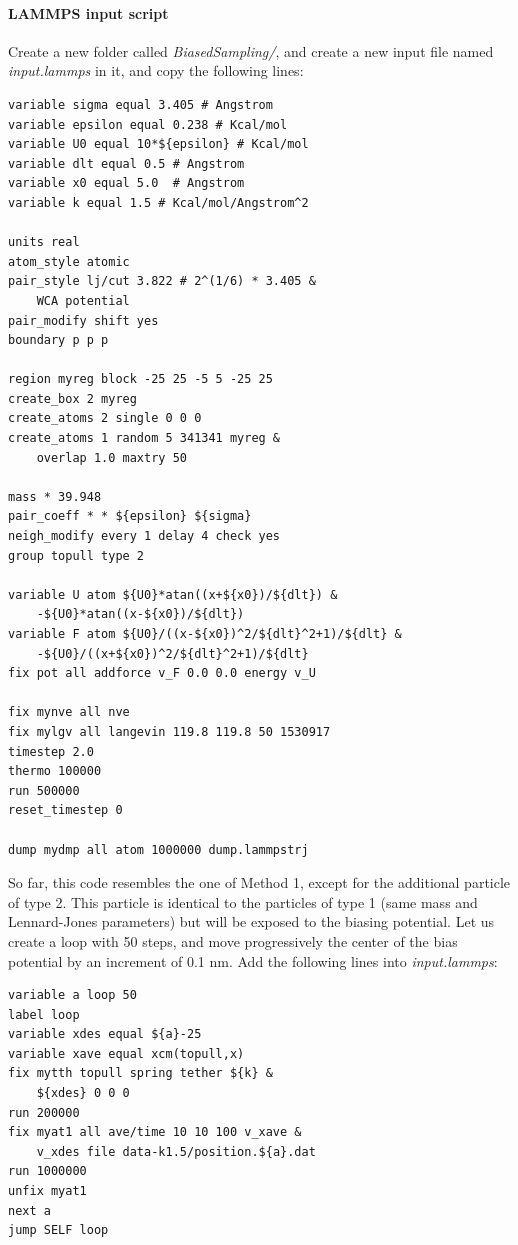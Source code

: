 \documentclass[9pt,tutorial]{livecoms}
\begin{document}
\paragraph{LAMMPS input script}
Create a new folder called \textit{BiasedSampling/}, and create a new input file named \textit{input.lammps} in it, and copy the following lines:
{\normalsize \begin{verbatim}
variable sigma equal 3.405 # Angstrom
variable epsilon equal 0.238 # Kcal/mol
variable U0 equal 10*${epsilon} # Kcal/mol
variable dlt equal 0.5 # Angstrom
variable x0 equal 5.0  # Angstrom
variable k equal 1.5 # Kcal/mol/Angstrom^2

units real
atom_style atomic
pair_style lj/cut 3.822 # 2^(1/6) * 3.405 &
    WCA potential
pair_modify shift yes
boundary p p p

region myreg block -25 25 -5 5 -25 25
create_box 2 myreg
create_atoms 2 single 0 0 0
create_atoms 1 random 5 341341 myreg &
    overlap 1.0 maxtry 50

mass * 39.948
pair_coeff * * ${epsilon} ${sigma}
neigh_modify every 1 delay 4 check yes
group topull type 2

variable U atom ${U0}*atan((x+${x0})/${dlt}) &
    -${U0}*atan((x-${x0})/${dlt})
variable F atom ${U0}/((x-${x0})^2/${dlt}^2+1)/${dlt} &
    -${U0}/((x+${x0})^2/${dlt}^2+1)/${dlt}
fix pot all addforce v_F 0.0 0.0 energy v_U

fix mynve all nve
fix mylgv all langevin 119.8 119.8 50 1530917
timestep 2.0
thermo 100000
run 500000
reset_timestep 0

dump mydmp all atom 1000000 dump.lammpstrj
\end{verbatim}}
So far, this code resembles the one of Method 1, except for the additional particle of type 2. This particle is identical to the particles of type 1 (same mass and Lennard-Jones parameters) but will be exposed to the biasing potential. Let us create a loop with 50 steps, and move progressively the center of the bias potential by an increment of 0.1 nm. Add the following lines into \textit{input.lammps}:
{\normalsize \begin{verbatim}
variable a loop 50
label loop
variable xdes equal ${a}-25
variable xave equal xcm(topull,x)
fix mytth topull spring tether ${k} &
    ${xdes} 0 0 0
run 200000
fix myat1 all ave/time 10 10 100 v_xave &
    v_xdes file data-k1.5/position.${a}.dat
run 1000000
unfix myat1
next a
jump SELF loop
\end{verbatim}}
\end{document}
